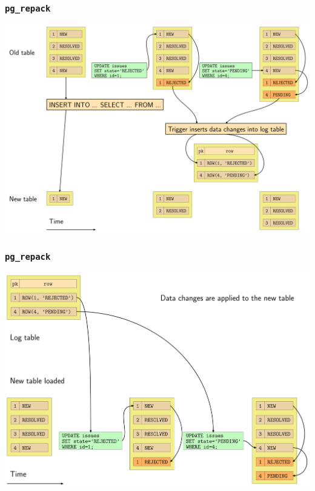 \begin{frame}
  \frametitle{\texttt{pg\_repack}}
  \begin{center}
    \includegraphics[height=\sizeforimages\textheight]{images/pg_repack_01.png}
  \end{center}
\end{frame}

\begin{frame}
  \frametitle{\texttt{pg\_repack}}
  \begin{center}
    \includegraphics[height=\sizeforimages\textheight]{images/pg_repack_02.png}
  \end{center}
\end{frame}

